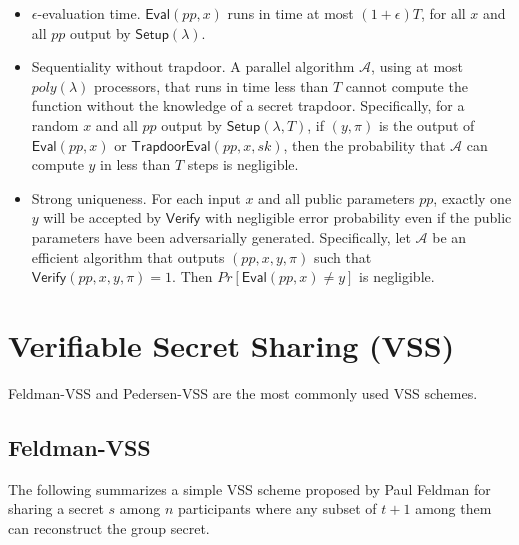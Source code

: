 \documentclass[letterpaper,twocolumn,10pt]{article}
\theoremstyle{definition}
\theoremstyle{remark}
\begin{document}
\begin{itemize}
    \item $\epsilon$-evaluation time. $\mathsf{Eval}(pp, x)$ runs in time at most $(1 + \epsilon) T$, for all $x$ and all $pp$ output by $\mathsf{Setup}(\lambda)$.
    \item Sequentiality without trapdoor. A parallel algorithm $\mathcal{A}$, using at most $poly(\lambda)$ processors, that runs in time less than $T$ cannot compute the function without the knowledge of a secret trapdoor. Specifically, for a random $x$ and all $pp$ output by $\mathsf{Setup}(\lambda, T)$, if $(y, \pi)$ is the output of $\mathsf{Eval}(pp, x)$ or $\mathsf{TrapdoorEval}(pp, x, sk)$, then the probability that $\mathcal{A}$ can compute $y$ in less than $T$ steps is negligible.
    \item Strong uniqueness. For each input $x$ and all public parameters $pp$, exactly one $y$ will be accepted by $\mathsf{Verify}$ with negligible error probability even if the public parameters have been adversarially generated. Specifically, let $\mathcal{A}$ be an efficient algorithm that outputs $(pp, x, y, \pi)$ such that $\mathsf{Verify}(pp, x, y, \pi) = 1$. Then $Pr[\mathsf{Eval}(pp, x) \neq y]$ is negligible.
\end{itemize}

\fi

\iffalse
\section{Verifiable Secret Sharing (VSS)}
\label{appendix:vss}

\iffalse
    VSS schemes have two security requirements:
    \begin{itemize}
        \item Secrecy. If the dealer is honest, then the probability of an adversary learning
        any information about the dealer's secret in the sharing phase is $\mathsf{negl}(\lambda)$.
        \item Correctness. If the dealer is honest, then the honest nodes output the secret
        $s$ at the end of the reconstruction phase with a high probability of $1 - \mathsf{negl}(\lambda)$.
    \end{itemize}
\fi
Feldman-VSS \cite{feldman1987practical} and Pedersen-VSS \cite{pedersen1991non} are the most commonly used VSS schemes.

\subsection{Feldman-VSS}
\label{appendix:feldmanVSS}
The following summarizes a simple VSS scheme proposed by Paul Feldman for sharing a secret $s$ among $n$ participants where any subset of $t + 1$ among them can reconstruct the group secret.
\end{document}
